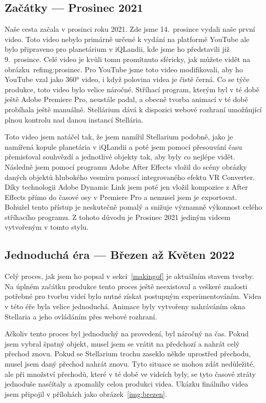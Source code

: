 \documentclass[12pt,a4paper,titlepage]{article}
\begin{document}
\subsection{Začátky --- Prosinec 2021}
Naše cesta začala v prosinci roku 2021. Zde jsme 14.\ prosince vydali naše první video. Toto video nebylo primárně určené k vydání na platformě YouTube ale bylo připraveno pro planetárium v iQLandii, kde jsme ho představili již 9.\ prosince. Celé video je kvůli tomu promítnuto sféricky, jak můžete vidět na obrázku~ref{img:prosinec}. Pro YouTube jsme toto video modifikovali, aby ho YouTube vzal jako 360° video, i když polovina videa je čistě černá. Co se týče produkce, toto video bylo velice náročné. Stříhací program, kterým byl v té době ještě Adobe Premiere Pro, neustále padal, a obecně tvorba animací v té době probíhala ještě manuálně. Stellárium dává k dispozici webové rozhraní umožňující plnou kontrolu nad danou instancí Stellária. 

Toto video jsem natáčel tak, že jsem namířil Stellarium podobně, jako je namířená kopule planetária v iQLandii a poté jsem pomocí přesouvání času přemisťoval souhvězdí a jednotlivé objekty tak, aby byly co nejlépe vidět. Následně jsem pomocí programu Adobe After Effects vložil do scény obrázky daných objektů hlubokého vesmíru pomocí integrovaného efektu VR Converter. Díky technologii Adobe Dynamic Link jsem poté jen vložil kompozice z After Effects přímo do časové osy v Premiere Pro a nemusel jsem je exportovat. Bohužel tento přístup je neskutečně pomalý a snižuje významně výkonnost celého stříhacího programu. Z tohoto důvodu je Prosinec 2021 jediným videem vytvořeným v tomto stylu.
\subsection{Jednoduchá éra --- Březen až Květen 2022}
Celý proces, jak jsem ho popsal v sekci~\ref{makingof} je aktuálním stavem tvorby. Na úplném začátku produkce tento proces ještě neexistoval a veškeré znalosti potřebné pro tvorbu  videí bylo nutné získat postupným experimentováním. Videa v této éře byla velice jednoduchá. Animace byly vytvořeny nahráváním okna Stellaria a jeho ovládáním přes webové rozhraní. 

Ačkoliv tento proces byl jednoduchý na provedení, byl náročný na čas. Pokud jsem vybral špatný objekt, musel jsem se vrátit na předchozí a nahrát celý přechod znovu. Pokud se Stellarium trochu zaseklo někde uprostřed přechodu, musel jsem daný přechod nahrát znovu. Tyto situace se mohou zdát nedůležité, ale při množství přechodů, které v té době ve videích byly, se tyto časové ztráty jednoduše nasčítaly a zpomalily celou produkci videa. Ukázku finálního videa jsem připojil v přílohách jako obrázek~\ref{img:brezen}.
\end{document}
